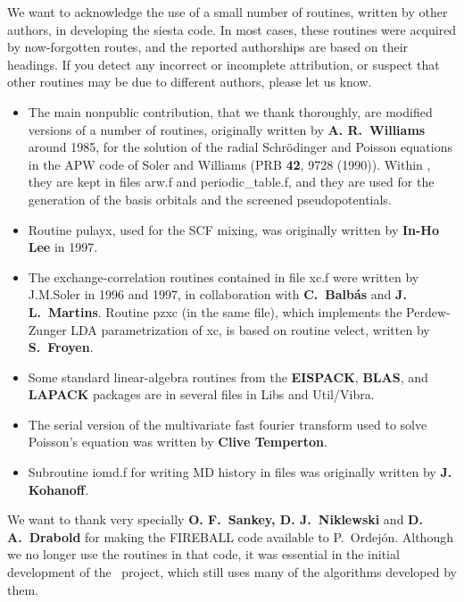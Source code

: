We want to acknowledge the use of a small number of routines,
written by other authors, in developing the siesta code.
In most cases, these routines were acquired by now-forgotten
routes, and the reported authorships are based on their headings.
If you detect any incorrect or incomplete attribution, or suspect
that other routines may be due to different authors, please
let us know.

\begin{itemize}
\item
The main nonpublic contribution, that we thank thoroughly, are
modified versions of a number of routines, originally written by \textbf{A. R.\ Williams} around 1985, for the solution of the radial
Schr\"odinger and Poisson equations in the APW code of Soler and
Williams (PRB \textbf{42}, 9728 (1990)).  Within \siesta, they are
kept in files arw.f and periodic\_table.f, and they are used for the
generation of the basis orbitals and the screened pseudopotentials.

\item
Routine pulayx, used for the SCF mixing, was originally written by
\textbf{In-Ho Lee} in 1997.

\item
The exchange-correlation routines contained in file xc.f were written
by J.M.Soler in 1996 and 1997, in collaboration with \textbf{C.\ Balb\'as} and \textbf{J. L.\ Martins}.  Routine pzxc (in the same
file), which implements the Perdew-Zunger LDA parametrization of xc,
is based on routine velect, written by \textbf{S.\ Froyen}.

\item
Some standard linear-algebra routines from the \textbf{EISPACK}, \textbf{BLAS}, and \textbf{LAPACK} packages are in several files in Libs and
Util/Vibra.

\item
The serial version of the multivariate fast fourier transform used to
solve Poisson's equation was written by \textbf{Clive Temperton}.

\item
Subroutine iomd.f for writing MD history in files was originally
written by \textbf{J. Kohanoff}.
\end{itemize}

We want to thank very specially \textbf{O. F.\ Sankey, D. J.\ Niklewski}
and \textbf{D. A.\ Drabold} for making the FIREBALL code available to
P.\ Ordej\'on.  Although we no longer use the routines in that code,
it was essential in the initial development of the \siesta\
project, which still uses many of the algorithms developed by them.

